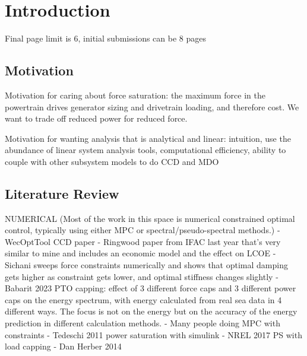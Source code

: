\documentclass{ifacconf}
\begin{document}
\section{Introduction}
Final page limit is 6, initial submissions can be 8 pages

\subsection{Motivation}
Motivation for caring about force saturation: the maximum force in the powertrain drives generator sizing and drivetrain loading, and therefore cost. We want to trade off reduced power for reduced force.

Motivation for wanting analysis that is analytical and linear: intuition, use the abundance of linear system analysis tools, computational efficiency, ability to couple with other subsystem models to do CCD and MDO

\subsection{Literature Review}
NUMERICAL (Most of the work in this space is numerical constrained optimal control, typically using either MPC or spectral/pseudo-spectral methods.)
- WecOptTool CCD paper \cite{strofer_control_2023}
- Ringwood paper from IFAC last year that's very similar to mine and includes an economic model and the effect on LCOE \cite{pena-sanchez_control_2022}
- Sichani sweeps force constraints numerically and shows that optimal damping gets higher as constraint gets lower, and optimal stiffness changes slightly \cite{sichani_constrained_2014}
- Babarit 2023 PTO capping: effect of 3 different force caps and 3 different power caps on the energy spectrum, with energy calculated from real sea data in 4 different ways. The focus is not on the energy but on the accuracy of the energy prediction in different calculation methods. \cite{de_la_torre-castro_combined_2023}
- Many people doing MPC with constraints
- Tedeschi 2011 power saturation with simulink \cite{tedeschi_effect_2011}
- NREL 2017 PS with load capping \cite{tom_pseudo-spectral_2017}
- Dan Herber 2014 \cite{herber_wave_2014}
\end{document}
